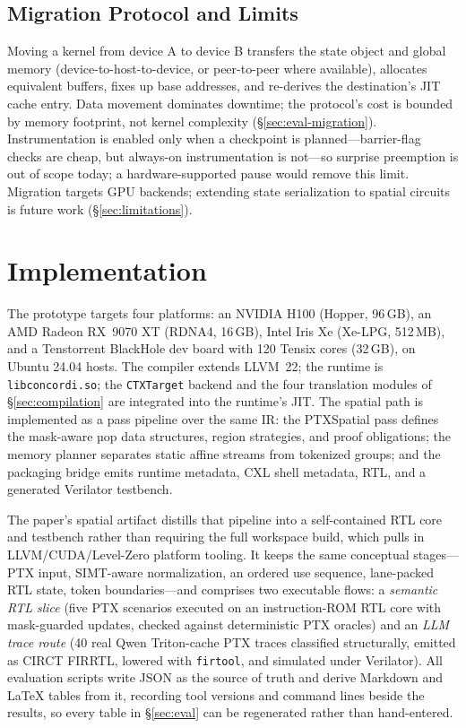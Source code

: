 \documentclass[sigplan,nonacm]{acmart}
\begin{document}
\subsection{Migration Protocol and Limits}
\label{sec:migration}

Moving a kernel from device A to device B transfers the state object and
global memory (device-to-host-to-device, or peer-to-peer where available),
allocates equivalent buffers, fixes up base addresses, and re-derives the
destination's JIT cache entry.  Data movement dominates downtime; the
protocol's cost is bounded by memory footprint, not kernel complexity
(\S\ref{sec:eval-migration}).  Instrumentation is enabled only when a
checkpoint is planned---barrier-flag checks are cheap, but always-on
instrumentation is not---so surprise preemption is out of scope today; a
hardware-supported pause would remove this limit.  Migration targets GPU
backends; extending state serialization to spatial circuits is future work
(\S\ref{sec:limitations}).

\section{Implementation}
\label{sec:impl}

The prototype targets four platforms: an NVIDIA H100 (Hopper, 96\,GB), an
AMD Radeon RX~9070 XT (RDNA4, 16\,GB), Intel Iris Xe (Xe-LPG, 512\,MB), and
a Tenstorrent BlackHole dev board with 120 Tensix cores (32\,GB), on Ubuntu
24.04 hosts.  The compiler extends LLVM~22; the runtime is
\texttt{libconcordi.so}; the \texttt{CTXTarget} backend and the four
translation modules of \S\ref{sec:compilation} are integrated into the
runtime's JIT.  The spatial path is implemented as a pass pipeline over the
same IR: the PTXSpatial pass defines the mask-aware µop data structures,
region strategies, and proof obligations; the memory planner separates
static affine streams from tokenized groups; and the packaging bridge emits
runtime metadata, CXL shell metadata, RTL, and a generated Verilator
testbench.

The paper's spatial artifact distills that pipeline into a self-contained
RTL core and testbench rather than requiring the full workspace build,
which pulls in LLVM/CUDA/Level-Zero platform tooling.  It keeps the same
conceptual stages---PTX input, SIMT-aware normalization, an ordered use
sequence, lane-packed RTL state, token boundaries---and comprises two
executable flows: a \emph{semantic RTL slice} (five PTX scenarios executed
on an instruction-ROM RTL core with mask-guarded updates, checked against
deterministic PTX oracles) and an \emph{LLM trace route} (40 real Qwen
Triton-cache PTX traces classified structurally, emitted as CIRCT FIRRTL,
lowered with \texttt{firtool}, and simulated under Verilator).  All
evaluation scripts write JSON as the source of truth and derive Markdown
and \LaTeX{} tables from it, recording tool versions and command lines
beside the results, so every table in \S\ref{sec:eval} can be regenerated
rather than hand-entered.
\end{document}
